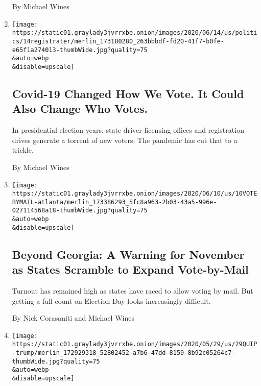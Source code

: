 \begin{enumerate}
  By Michael Wines
\item
  \href{/2020/06/14/us/voter-registration-coronavirus-2020-election.html}{}

  \texttt{[image: https://static01.graylady3jvrrxbe.onion/images/2020/06/14/us/politics/14registrater/merlin\_173180280\_263bbbdf-fd20-41f7-b0fe-e65f1a274013-thumbWide.jpg?quality=75\\\&auto=webp\\\&disable=upscale]}

  \hypertarget{covid-19-changed-how-we-vote-it-could-also-change-who-votes}{%
  \subsection{Covid-19 Changed How We Vote. It Could Also Change Who
  Votes.}\label{covid-19-changed-how-we-vote-it-could-also-change-who-votes}}

  In presidential election years, state driver licensing offices and
  registration drives generate a torrent of new voters. The pandemic has
  cut that to a trickle.

  By Michael Wines
\item
  \href{/2020/06/10/us/politics/voting-by-mail-georgia.html}{}

  \texttt{[image: https://static01.graylady3jvrrxbe.onion/images/2020/06/10/us/10VOTEBYMAIL-atlanta/merlin\_173386293\_5fc8a963-2b03-43a5-996e-027114568a18-thumbWide.jpg?quality=75\\\&auto=webp\\\&disable=upscale]}

  \hypertarget{beyond-georgia-a-warning-for-november-as-states-scramble-to-expand-vote-by-mail}{%
  \subsection{Beyond Georgia: A Warning for November as States Scramble
  to Expand
  Vote-by-Mail}\label{beyond-georgia-a-warning-for-november-as-states-scramble-to-expand-vote-by-mail}}

  Turnout has remained high as states have raced to allow voting by
  mail. But getting a full count on Election Day looks increasingly
  difficult.

  By Nick Corasaniti and Michael Wines
\item
  \href{/2020/05/29/us/looting-starts-shooting-starts.html}{}

  \texttt{[image: https://static01.graylady3jvrrxbe.onion/images/2020/05/29/us/29QUIP-trump/merlin\_172929318\_52802452-a7b6-47dd-8159-8b92c05264c7-thumbWide.jpg?quality=75\\\&auto=webp\\\&disable=upscale]}

  \hypertarget{looting-comment-from-trump-dates-back-to-racial-unrest-of-the-1960s}{%
}
\end{enumerate}

